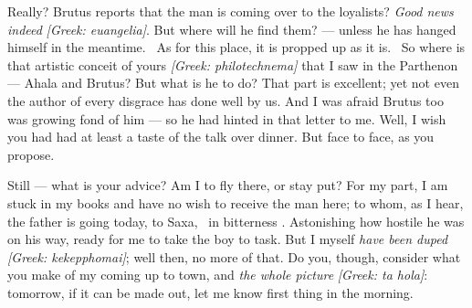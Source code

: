 

 Really? Brutus reports that the man is coming over to the loyalists? \textit{Good news indeed} \textit{[Greek: euangelia]}. But where will he find them? --- unless he has hanged himself in the meantime. \dag\ As for this place, it is propped up as it is. \dag\ So where is that artistic conceit of yours \textit{[Greek: philotechnema]} that I saw in the Parthenon --- Ahala and Brutus? But what is he to do? That part is excellent; yet not even the author of every disgrace has done well by us. And I was afraid Brutus too was growing fond of him --- so he had hinted in that letter to me. Well, I wish you had had at least a taste of the talk over dinner. But face to face, as you propose.

 Still --- what is your advice? Am I to fly there, or stay put? For my part, I am stuck in my books and have no wish to receive the man here; to whom, as I hear, the father is going today, to Saxa, \dag\ in bitterness \dag. Astonishing how hostile he was on his way, ready for me to take the boy to task. But I myself \textit{have been duped} \textit{[Greek: kekepphomai]}; well then, no more of that. Do you, though, consider what you make of my coming up to town, and \textit{the whole picture} \textit{[Greek: ta hola]}: tomorrow, if it can be made out, let me know first thing in the morning.
